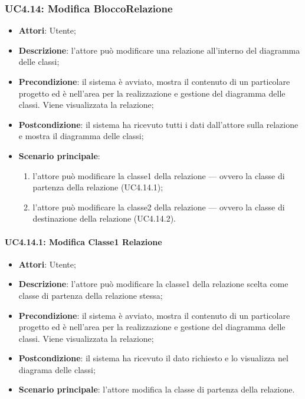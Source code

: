 \subsubsection{UC4.14: Modifica BloccoRelazione}
\label{UC4.14}
\begin{itemize}
	\item \textbf{Attori}: Utente;
	\item \textbf{Descrizione}: l'attore può modificare una relazione all'interno del diagramma delle classi;
	\item \textbf{Precondizione}: il sistema è avviato, mostra il contenuto di un particolare progetto ed è nell'area per la realizzazione e gestione del diagramma delle classi. Viene visualizzata la relazione;
	\item \textbf{Postcondizione}: il sistema ha ricevuto tutti i dati dall'attore sulla relazione e mostra il diagramma delle classi;
	\item \textbf{Scenario principale}:
	\begin{enumerate}
		\item l'attore può modificare la classe1 della relazione --- ovvero la classe di partenza della relazione (UC4.14.1);
		\item l'attore può modificare la classe2 della relazione --- ovvero la classe di destinazione della relazione (UC4.14.2).
	\end{enumerate}
\end{itemize}

\paragraph{UC4.14.1: Modifica Classe1 Relazione}
\label{UC4.14.2}
\begin{itemize}
	\item \textbf{Attori}: Utente;
	\item \textbf{Descrizione}: l'attore può modificare la classe1 della relazione scelta come classe di partenza della relazione stessa;
	\item \textbf{Precondizione}: il sistema è avviato, mostra il contenuto di un particolare progetto ed è nell'area per la realizzazione e gestione del diagramma delle classi. Viene visualizzata la relazione;
	\item \textbf{Postcondizione}: il sistema ha ricevuto il dato richiesto e lo visualizza nel diagrama delle classi;
	\item \textbf{Scenario principale}: l'attore modifica la classe di partenza della relazione.
\end{itemize}

